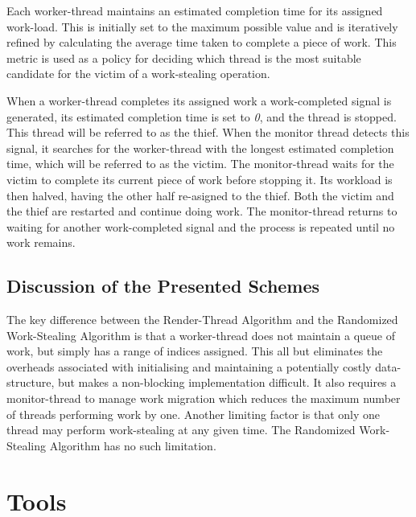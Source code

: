 Each \gls{worker-thread} maintains an estimated completion time for its assigned work-load. This is initially set to the maximum possible value and
is iteratively refined by calculating the average time taken to complete a piece of work. This metric is used as a policy for deciding which
thread is the most suitable candidate for the victim of a work-stealing operation.

When a worker-thread completes its assigned work a work-completed signal is generated, its estimated
completion time is set to \textit{0}, and the thread is stopped. This thread will be referred to as the \gls{thief}.
When the monitor thread detects this signal, it searches for the worker-thread with the longest estimated completion time, 
which will be referred to as the \gls{victim}. The \gls{monitor-thread} waits for the victim to complete its current piece of work before stopping it.
Its workload is then halved, having the other half re-asigned to the thief. Both the victim and the thief are restarted and continue doing work.
The monitor-thread returns to waiting for another work-completed signal and the process is repeated until no work remains.


\subsection*{Discussion of the Presented Schemes}
The key difference between the Render-Thread Algorithm and the Randomized Work-Stealing Algorithm 
is that a \gls{worker-thread} does not maintain a queue of work, but simply has a range of indices assigned. 
This all but eliminates the overheads associated with initialising and 
maintaining a potentially costly data-structure, but makes a \gls{non-blocking} implementation difficult. It also requires a monitor-thread to manage
work migration which reduces the maximum number of threads performing work by one. 
Another limiting factor is that only one thread may perform work-stealing at any given time. The Randomized Work-Stealing Algorithm has no such limitation.



\section{Tools}
\label{sec:restools}

